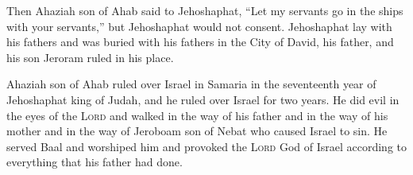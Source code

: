 \begin{inparaenum}
     Then Ahaziah son of Ahab said to Jehoshaphat, ``Let my servants go in the ships with your servants,'' but Jehoshaphat would not consent.%
     Jehoshaphat lay with his fathers and was buried with his fathers in the City of David, his father, and his son Jeroram ruled in his place.%
    
     Ahaziah son of Ahab ruled over Israel in Samaria in the seventeenth year of Jehoshaphat king of Judah, and he ruled over Israel for two years.%
     He did evil in the eyes of the \textsc{Lord} and walked in the way of his father and in the way of his mother and in the way of Jeroboam son of Nebat who caused Israel to sin.%
     He served Baal and worshiped him and provoked the \textsc{Lord} God of Israel according to everything that his father had done.%
\end{inparaenum}
